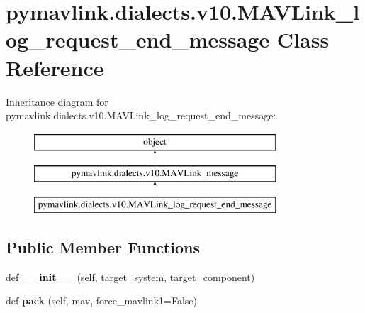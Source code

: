 \hypertarget{classpymavlink_1_1dialects_1_1v10_1_1MAVLink__log__request__end__message}{}\section{pymavlink.\+dialects.\+v10.\+M\+A\+V\+Link\+\_\+log\+\_\+request\+\_\+end\+\_\+message Class Reference}
\label{classpymavlink_1_1dialects_1_1v10_1_1MAVLink__log__request__end__message}
Inheritance diagram for pymavlink.\+dialects.\+v10.\+M\+A\+V\+Link\+\_\+log\+\_\+request\+\_\+end\+\_\+message\+:\begin{figure}[H]
\begin{center}
\leavevmode
\includegraphics[height=3.000000cm]{classpymavlink_1_1dialects_1_1v10_1_1MAVLink__log__request__end__message}
\end{center}
\end{figure}
\subsection*{Public Member Functions}
\begin{DoxyCompactItemize}
\item 
\mbox{\label{classpymavlink_1_1dialects_1_1v10_1_1MAVLink__log__request__end__message_a579c8d5c84784bb9bf7998cb97f5959b}} 
def {\bfseries \+\_\+\+\_\+init\+\_\+\+\_\+} (self, target\+\_\+system, target\+\_\+component)
\item 
\mbox{\label{classpymavlink_1_1dialects_1_1v10_1_1MAVLink__log__request__end__message_ab7e88fbbbb05a6adad56d510f1ad1a8b}} 
def {\bfseries pack} (self, mav, force\+\_\+mavlink1=False)
\end{DoxyCompactItemize}
